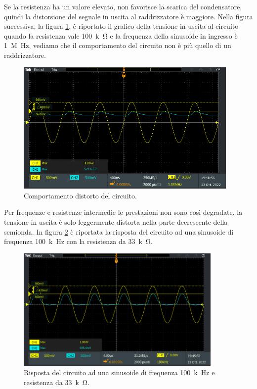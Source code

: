 \documentclass{report}
\begin{document}
Se la resistenza ha un valore elevato, non favorisce la scarica del condensatore, quindi la distorsione del segnale in uscita al raddrizzatore è maggiore. Nella figura successiva, la figura \ref{figura:caso1}, è riportato il grafico della tensione in uscita al circuito quando la resistenza vale \SI{100}{k\ohm} e la frequenza della sinusoide in ingresso è \SI{1}{M\hertz}, vediamo che il comportamento del circuito non è più quello di un raddrizzatore. \par
\begin{figure}[h!]
	\centering
	\includegraphics[height=6.5cm]{immagini/TEK00015}
	\caption{Comportamento distorto del circuito.}
	\label{figura:caso1}
\end{figure} 
\noindent Per frequenze e resistenze intermedie le prestazioni non sono così degradate, la tensione in uscita è solo leggermente distorta nella parte decrescente della semionda. In figura \ref{figura:caso2} è riportata la risposta del circuito ad una sinusoide di frequenza \SI{100}{k\hertz} con la resistenza da \SI{33}{k\ohm}.
\begin{figure}[h!]
	\centering
	\includegraphics[height=6cm]{immagini/TEK00008}
	\caption{Risposta del circuito ad una sinusoide di frequenza \SI{100}{k\hertz} e resistenza da \SI{33}{k\ohm}.}
	\label{figura:caso2}
\end{figure} 
\newpage
\end{document}
